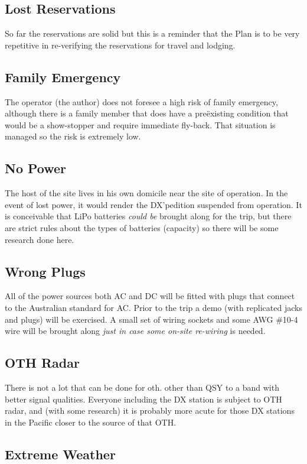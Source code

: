 \documentclass[11pt]{article}
\begin{document}
\subsection{Lost Reservations}
  So far the reservations are solid but this is a reminder that the Plan is to 
be very repetitive in re-verifying the reservations
for travel and lodging.

\subsection{Family Emergency}
 The operator (the author) does not foresee
a high risk of family emergency, although there is a family member
that does have a pre\"existing condition that would be a show-stopper
and require immediate fly-back.  That situation is managed so the
risk is extremely low.

\subsection{No Power}
  The host of the site lives in his own domicile near
the site of operation.  In the event of lost power, it would render
the DX'pedition suspended from operation.   It is conceivable that
LiPo batteries {\textit{could be}} brought along for the trip, but
there are strict rules about the types of batteries (capacity) so
there will be some research done here.


\subsection{Wrong Plugs}
  All of the power sources both AC and DC will be
fitted with plugs that connect to the Australian standard for AC.  Prior
to the trip a demo (with replicated jacks and plugs) will be exercised.
A small set of wiring sockets and some AWG \#10-4 wire will be brought
along {\textit{just in case some on-site re-wiring}} is needed.


\subsection{OTH Radar}
There is not a lot that can be done for {\gls{oth}}.
other than QSY to a band with better signal qualities.   Everyone
including the DX station is subject to OTH radar, and (with some 
research) it is probably more acute for those DX stations in the Pacific
closer to the source of that OTH.


\subsection{Extreme Weather}
\end{document}
